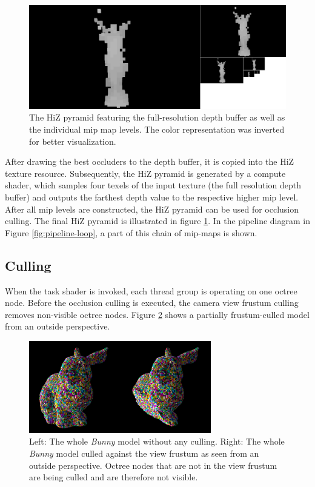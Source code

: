 \begin{figure}[h]
    \centering
    \includegraphics[width=\linewidth]{images/graphics/lucy-hiz-pyramid-inverted.jpg}
    \caption{The \ac{HiZ} pyramid featuring the full-resolution depth buffer as well as the individual mip map 
    levels. The color representation was inverted for better visualization.}
    \label{fig:lucy-hiz-pyramid}
\end{figure}

\clearpage

\noindent
After drawing the best occluders to the depth buffer, it is copied into the \ac{HiZ} texture resource. Subsequently, 
the \ac{HiZ} pyramid is generated by a compute shader, which samples four texels of the input texture (the full resolution 
depth buffer) and outputs the farthest depth value to the respective higher mip level. After all mip levels are constructed, 
the \ac{HiZ} pyramid can be used for occlusion culling. The final \ac{HiZ} pyramid is illustrated in figure 
\ref{fig:lucy-hiz-pyramid}. In the pipeline diagram in Figure \ref{fig:pipeline-loop}, a part of this chain of mip-maps is shown.

\subsection*{Culling} \label{subsec-task-shader}

When the task shader is invoked, each thread group is operating on one octree node. Before the 
occlusion culling is executed, the camera view frustum culling removes non-visible octree nodes. 
Figure \ref{fig:bunny-frustum-culling} shows a partially frustum-culled model from an outside 
perspective. \\

\begin{figure}[!htb]
    \centering
    \includegraphics[width=300px]{images/graphics/bunny-frustum-culling.jpg}
    \caption{Left: The whole \emph{Bunny} model without any culling. 
    Right: The whole \emph{Bunny} model culled against the view frustum as seen from an outside perspective. 
    Octree nodes that are not in the view frustum are being culled and are therefore not visible.}
    \label{fig:bunny-frustum-culling}
\end{figure}

